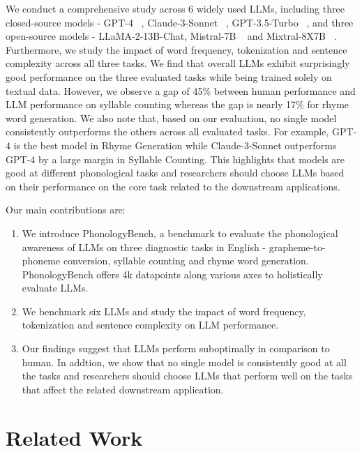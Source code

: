 We conduct a comprehensive study across 6 widely used LLMs, including three closed-source models - GPT-4 ~\citep{openai2023gpt4}, Claude-3-Sonnet ~\citep{claude}, GPT-3.5-Turbo ~\citep{chatgpt2022}, and three open-source models - LLaMA-2-13B-Chat, Mistral-7B ~\citep{jiang2023mistral} and Mixtral-8X7B ~\citep{jiang2024mixtral}. Furthermore, we study the impact of word frequency, tokenization and sentence complexity across all three tasks. We find that overall LLMs exhibit surprisingly good performance on the three evaluated tasks while being trained solely on textual data. However, we observe a gap of 45\% between human performance and LLM performance on syllable counting whereas the gap is nearly 17\% for rhyme word generation. We also note that, based on our evaluation, no single model consistently outperforms the others across all evaluated tasks. For example, GPT-4 is the best model in Rhyme Generation while Claude-3-Sonnet outperforms GPT-4 by a large margin in Syllable Counting. This highlights that models are good at different phonological tasks and researchers should choose LLMs based on their performance on the core task related to the downstream applications.

Our main contributions are:

\begin{enumerate}
    \item We introduce PhonologyBench, a benchmark to evaluate the phonological awareness of LLMs on three diagnostic tasks in English - grapheme-to-phoneme conversion, syllable counting and rhyme word generation. PhonologyBench offers 4k datapoints along various axes to holistically evaluate LLMs. 
    \item We benchmark six LLMs and study the impact of word frequency, tokenization and sentence complexity on LLM performance.  
    \item Our findings suggest that LLMs perform suboptimally in comparison to human. In addtion, we show that no single model is consistently good at all the tasks and researchers should choose LLMs that perform well on the tasks that affect the related downstream application.
\end{enumerate}

\section{Related Work}

